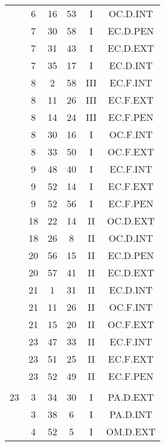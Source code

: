 \documentclass[12pt, a4paper]{article}
\begin{document}
\begin{multicols}{3}
{\begin{tabular}{c c c c c c}
	 	 	 	 & 6 & 16 & 53 & I & OC.D.INT\\%
	 	 	 	 & 7 & 30 & 58 & I & EC.D.PEN\\%
	 	 	 	 & 7 & 31 & 43 & I & EC.D.EXT\\%
	 	 	 	 & 7 & 35 & 17 & I & EC.D.INT\\%
	 	 	 	 & 8 & 2 & 58 & III & EC.F.INT\\%
	 	 	 	 & 8 & 11 & 26 & III & EC.F.EXT\\%
	 	 	 	 & 8 & 14 & 24 & III & EC.F.PEN\\%
	 	 	 	 & 8 & 30 & 16 & I & OC.F.INT\\%
	 	 	 	 & 8 & 33 & 50 & I & OC.F.EXT\\%
	 	 	 	 & 9 & 48 & 40 & I & EC.F.INT\\%
	 	 	 	 & 9 & 52 & 14 & I & EC.F.EXT\\%
	 	 	 	 & 9 & 52 & 56 & I & EC.F.PEN\\%
	 	 	 	 & 18 & 22 & 14 & II & OC.D.EXT\\%
	 	 	 	 & 18 & 26 & 8 & II & OC.D.INT\\%
	 	 	 	 & 20 & 56 & 15 & II & EC.D.PEN\\%
	 	 	 	 & 20 & 57 & 41 & II & EC.D.EXT\\%
	 	 	 	 & 21 & 1 & 31 & II & EC.D.INT\\%
	 	 	 	 & 21 & 11 & 26 & II & OC.F.INT\\%
	 	 	 	 & 21 & 15 & 20 & II & OC.F.EXT\\%
	 	 	 	 & 23 & 47 & 33 & II & EC.F.INT\\%
	 	 	 	 & 23 & 51 & 25 & II & EC.F.EXT\\%
	 	 	 	 & 23 & 52 & 49 & II & EC.F.PEN\\%
	 	 	 	 & & & & & \\%
	 	 	 	23 & 3 & 34 & 30 & I & PA.D.EXT\\%
	 	 	 	 & 3 & 38 & 6 & I & PA.D.INT\\%
	 	 	 	 & 4 & 52 & 5 & I & OM.D.EXT\\%
	 	 \end{tabular}
 	}
\end{multicols}
\end{document}
